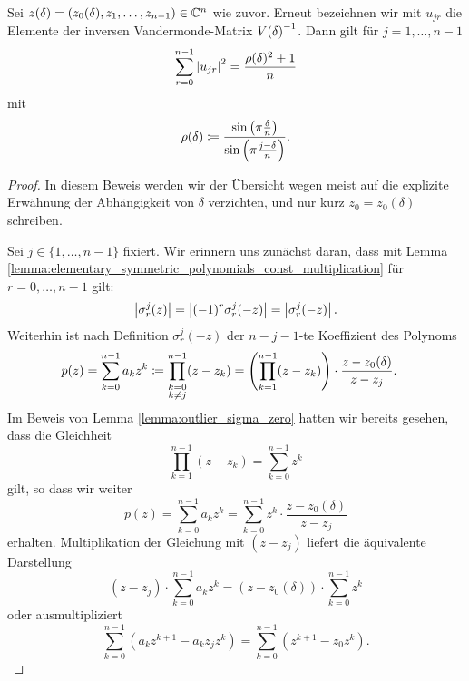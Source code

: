 \begin{lemma}
    \label{lemma:inverse_outlier_nonzero_row_quadratic_sum}
    Sei $z(\delta) = (z_0(\delta), z_1, \dots, z_{n-1}) \in \mathbb{C}^n$ wie zuvor.
    Erneut bezeichnen wir mit $u_{jr}$ die Elemente der inversen
    Vandermonde-Matrix $V \! \left( \delta \right)^{-1}$.
    Dann gilt für ${j = 1, \dots, n-1}$
    \begin{equation}
        \sum_{r=0}^{n-1} \left\lvert u_{jr} \right\rvert^2
        = \frac{\rho(\delta)^2 + 1}{n}
    \end{equation}
    mit
    \[
        \rho(\delta) \coloneqq \frac{\sin \left( \pi \frac{\delta}{n} \right)}{\sin \left( \pi \frac{j - \delta}{n} \right)}.
    \]
\end{lemma}
\begin{proof}
    In diesem Beweis werden wir der Übersicht wegen meist auf die explizite
    Erwähnung der Abhängigkeit von $\delta$ verzichten, und nur kurz
    $z_0 = z_0(\delta)$ schreiben.

    \noindent Sei $j \in \{1, \dots, n-1\}$ fixiert.
    Wir erinnern uns zunächst daran, dass mit Lemma
    \ref{lemma:elementary_symmetric_polynomials_const_multiplication}
    für ${r = 0, \dots, n-1}$ gilt:
    \[
        \left\lvert  \sigma_r^j (z) \right\rvert
        = \left\lvert (-1)^r \sigma_r^j (-z)  \right\rvert
        = \left\lvert \sigma_r^j (-z)  \right\rvert.
    \]
    Weiterhin ist nach Definition $\sigma_r^j (-z)$ der $n\!-\!j\!-\!1$-te
    Koeffizient des Polynoms
    \[
        \begin{split}
            p(z)
            &= \sum_{k=0}^{n-1} a_k z^k
            \coloneqq \prod_{\substack{k=0 \\ k\neq j}}^{n-1} (z-z_k)
            = \left( \prod_{k=1}^{n-1} (z-z_k) \right) \cdot \frac{z-z_0(\delta)}{z-z_j}.
        \end{split}
    \]
    Im Beweis von Lemma
    \ref{lemma:outlier_sigma_zero}
    hatten wir bereits gesehen, dass die Gleichheit
    \[
        \prod_{k=1}^{n-1} (z-z_k) = \sum_{k=0}^{n-1} z^k
    \]
    gilt, so dass wir weiter
    \[
        p(z)
        = \sum_{k=0}^{n-1} a_k z^k
        = \sum_{k=0}^{n-1} z^k \cdot \frac{z-z_0(\delta)}{z-z_j}
    \]
    erhalten.
    Multiplikation der Gleichung mit $(z-z_j)$ liefert die äquivalente
    Darstellung
    \[
        (z-z_j) \cdot \sum_{k=0}^{n-1} a_k z^k
        = (z-z_0(\delta)) \cdot \sum_{k=0}^{n-1} z^k
    \]
    oder ausmultipliziert
    \[
        \sum_{k=0}^{n-1} \left( a_k z^{k+1} - a_k z_j z^k \right)
        = \sum_{k=0}^{n-1} \left( z^{k+1} - z_0 z^k \right).
    \]


\end{proof}
